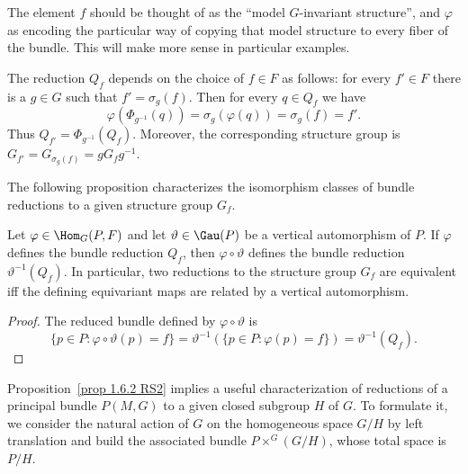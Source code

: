 The element $f$ should be thought of as the ``model $G$-invariant structure'', and $\varphi$ as encoding the particular way of copying that model structure to every fiber of the bundle. This will make more sense in particular examples.

\begin{rem}[{{\cite[Rem.~1.6.3]{RS2}}}]
    The reduction $Q_f$ depends on the choice of $f\in F$ as follows: for every $f'\in F$ there is a $g\in G$ such that $f'=\sigma_g(f)$. Then for every $q\in Q_f$ we have
    \[\varphi(\Phi_{g^{-1}}(q))=\sigma_g(\varphi(q))=\sigma_g(f)=f'.\]
    Thus $Q_{f'}=\Phi_{g^{-1}}(Q_f)$. Moreover, the corresponding structure group is $G_{f'}=G_{\sigma_g(f)}=gG_fg^{-1}$.
\end{rem}


The following proposition characterizes the isomorphism classes of bundle reductions to a given structure group $G_f$.

\begin{prop}[{{\cite[Prop.~1.6.4]{RS2}}}]\label{prop 1.6.4 RS2}
    Let $\varphi\in \Hom_G(P,F)$ and let $\vartheta\in\Gau(P)$ be a vertical automorphism of $P$. If $\varphi$ defines the bundle reduction $Q_f$, then $\varphi\circ\vartheta$ defines the bundle reduction $\vartheta^{-1}(Q_f)$. In particular, two reductions to the structure group $G_f$ are equivalent iff the defining equivariant maps are related by a vertical automorphism.
\end{prop}
\begin{proof}
    The reduced bundle defined by $\varphi\circ\vartheta$ is
    \[\{p\in P:\varphi\circ\vartheta(p)=f\}=\vartheta^{-1}\left(\{p\in P:\varphi(p)=f\}\right)=\vartheta^{-1}(Q_f).\]
\end{proof}

Proposition~\ref{prop 1.6.2 RS2} implies a useful characterization of reductions of a principal bundle $P(M,G)$ to a given closed subgroup $H$ of $G$. To formulate it, we consider the natural action of $G$ on the homogeneous space $G\slash H$ by left translation and build the associated bundle $P\times^G (G\slash H)$, whose total space is $P\slash H$.

